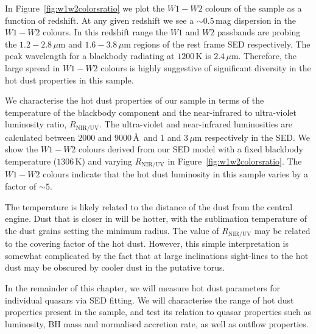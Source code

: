In Figure~\ref{fig:w1w2colorsratio} we plot the $W1 - W2$ colours of the sample as a function of redshift. 
At any given redshift we see a $\sim 0.5$\,mag dispersion in the $W1-W2$ colours. 
In this redshift range the $W1$ and $W2$ passbands are probing the $1.2 - 2.8$\,$\mu$m and $1.6 - 3.8$\,$\mu$m regions of the rest frame SED respectively. 
The peak wavelength for a blackbody radiating at $1200$\,K is $2.4$\,$\mu$m.
Therefore, the large spread in $W1-W2$ colours is highly suggestive of significant diversity in the hot dust properties in this sample. 

We characterise the hot dust properties of our sample in terms of the temperature of the blackbody component and the near-infrared to ultra-violet luminosity ratio, $R_{\text{NIR/UV}}$. 
The ultra-violet and near-infrared luminosities are calculated between $2000$ and $9000$\,\AA\, and $1$ and $3$\,$\mu$m respectively in the SED.
We show the $W1-W2$ colours derived from our SED model with a fixed blackbody temperature ($1306$\,K) and varying $R_{\text{NIR/UV}}$ in Figure~\ref{fig:w1w2colorsratio}.
The $W1-W2$ colours indicate that the hot dust luminosity in this sample varies by a factor of $\sim5$. 

The temperature is likely related to the distance of the dust from the central engine.
Dust that is closer in will be hotter, with the sublimation temperature of the dust grains setting the minimum radius.  
The value of $R_{\text{NIR/UV}}$ may be related to the covering factor of the hot dust. 
However, this simple interpretation is somewhat complicated by the fact that at large inclinations sight-lines to the hot dust may be obscured by cooler dust in the putative torus. 

In the remainder of this chapter, we will measure hot dust parameters for individual quasars via SED fitting. 
We will characterise the range of hot dust properties present in the sample, and test its relation to quasar properties such as luminosity, BH mass and normalised accretion rate, as well as outflow properties. 


